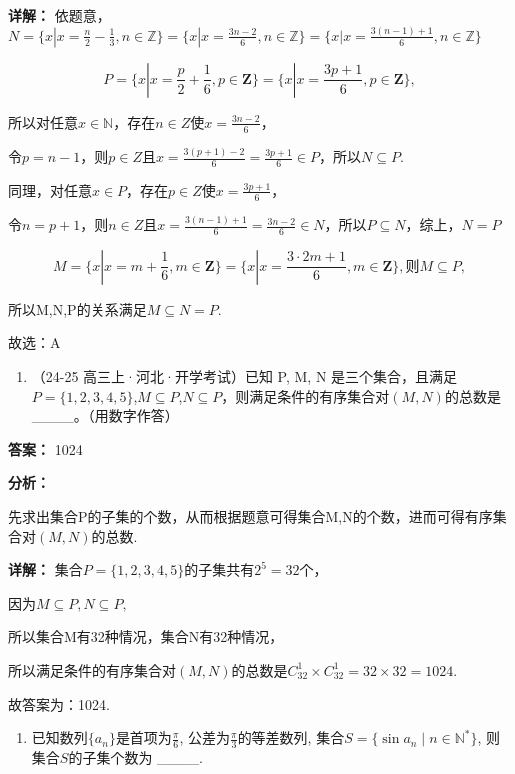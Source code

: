 \documentclass[11pt,a4paper]{ctexart}
\begin{document}
\textbf{详解：}
依题意，\(N=\{x|x=\frac{n}{2}-\frac{1}{3},n\in\mathbb{Z}\}=\{x|x=\frac{3n-2}{6},n\in\mathbb{Z}\}=\{x|x=\frac{3(n-1)+1}{6},n\in\mathbb{Z}\}\)

\[
P = \{x | x = \frac {p}{2} + \frac {1}{6}, p \in \mathbf {Z} \} = \{x | x = \frac {3 p + 1}{6}, p \in \mathbf {Z} \},
\]

所以对任意\(x \in \mathbb{N}\)，存在\(n \in Z\)使\(x = \frac{3n - 2}{6}\)，

令\(p = n - 1\)，则\(p \in Z\)且\(x = \frac{3(p + 1) - 2}{6} = \frac{3p + 1}{6} \in P\)，所以\(N \subseteq P\).

同理，对任意\(x \in P\)，存在\(p \in Z\)使\(x = \frac{3p + 1}{6}\)，

令\(n = p + 1\)，则\(n\in Z\)且\(x = \frac{3(n - 1) + 1}{6} = \frac{3n - 2}{6}\in N\)，所以\(P\subseteq N\)，综上，\(N = P\)

\[
M = \{x | x = m + \frac {1}{6}, m \in \mathbf {Z} \} = \{x | x = \frac {3 \cdot 2 m + 1}{6}, m \in \mathbf {Z} \}, \text {则} M \subseteq P,
\]

所以M,N,P的关系满足\(M\subseteq N=P\).

故选：A

\begin{enumerate}[label=\arabic*., leftmargin=*, start=6]
\item （24-25 高三上·河北·开学考试）已知 P, M, N
  是三个集合，且满足\(P = \{1, 2, 3, 4, 5\}\),\(M \subseteq P\),\(N \subseteq P\)，则满足条件的有序集合对\((M, N)\)的总数是
  \_\_\_\_。（用数字作答）
\end{enumerate}

\textbf{答案：}
1024

\textbf{分析：}

先求出集合P的子集的个数，从而根据题意可得集合M,N的个数，进而可得有序集合对\((M,N)\)的总数.

\textbf{详解：}
集合\(P = \{1,2,3,4,5\}\)的子集共有\(2^{5} = 32\)个，

因为\(M \subseteq P, N \subseteq P,\)

所以集合M有32种情况，集合N有32种情况，

所以满足条件的有序集合对\((M,N)\)的总数是\(C_{32}^{1}\times C_{32}^{1}=32\times32=1024.\)

故答案为：1024.

\begin{enumerate}[label=\arabic*., leftmargin=*, start=7]
\item 已知数列\(\{a_{n}\}\)是首项为\(\frac{\pi}{6}\),
  公差为\(\frac{\pi}{3}\)的等差数列,
  集合\(S = \{\sin a_{n} \mid n \in \mathbb{N}^{*}\}\),
  则集合\(S\)的子集个数为 \_\_\_\_.
\end{enumerate}
\end{document}
